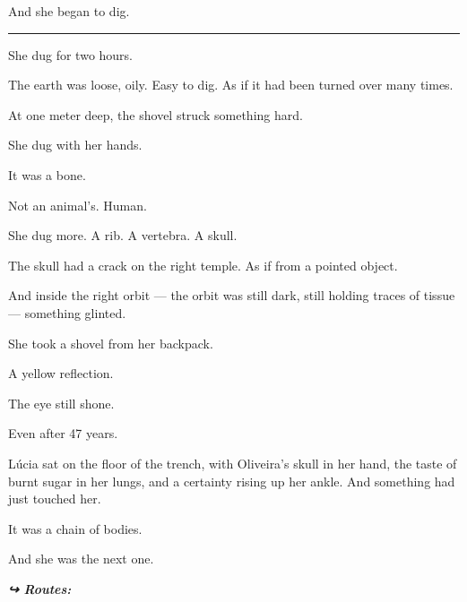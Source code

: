 \noindent And she began to dig.

\vspace{0.5em}\noindent\rule{\textwidth}{0.5pt}\vspace{0.5em}

\noindent She dug for two hours.

\noindent The earth was loose, oily. Easy to dig. As if it had been turned over many times.

\noindent At one meter deep, the shovel struck something hard.

\noindent She dug with her hands.

\noindent It was a bone.

\noindent Not an animal's. Human.

\noindent She dug more. A rib. A vertebra. A skull.

\noindent The skull had a crack on the right temple. As if from a pointed object.

\noindent And inside the right orbit --- the orbit was still dark, still holding traces of tissue --- something glinted.

\noindent She took a shovel from her backpack.

\noindent A yellow reflection.

\noindent The eye still shone.

\noindent Even after 47 years.

\noindent Lúcia sat on the floor of the trench, with Oliveira's skull in her hand, the taste of burnt sugar in her lungs, and a certainty rising up her ankle.
\noindent And something had just touched her.

\noindent It was a chain of bodies.

\noindent And she was the next one.

\vspace{0.5em}
\noindent\textit{\textbf{↪ Routes:}  \rotasep {}}
